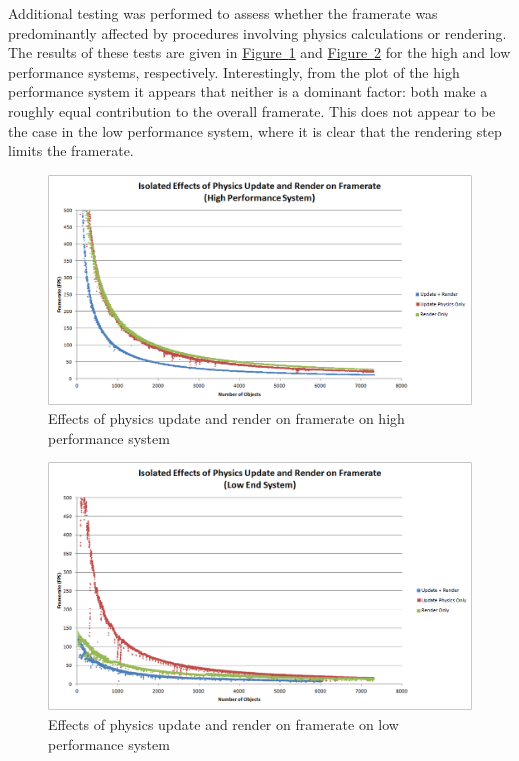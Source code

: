 \documentclass[12pt, titlepage]{article}
\begin{document}
Additional testing was performed to assess whether the framerate was predominantly affected by procedures involving physics calculations or rendering.  The results of these tests are given in \hyperref[fig:isohi]{Figure~\ref*{fig:isohi}} and \hyperref[fig:isolo]{Figure~\ref*{fig:isolo}} for the high and low performance systems, respectively.  Interestingly, from the plot of the high performance system it appears that neither is a dominant factor:  both make a roughly equal contribution to the overall framerate.  This does not appear to be the case in the low performance system, where it is clear that the rendering step limits the framerate.

\begin{figure}[htb]
\centering
\includegraphics[width=\textwidth]{isolatedhigh}
\caption{Effects of physics update and render on framerate on high performance system} \label{fig:isohi}
\end{figure}


\begin{figure}[htb]
\centering
\includegraphics[width=\textwidth]{isolatedlo}
\caption{Effects of physics update and render on framerate on low performance system} \label{fig:isolo}
\end{figure}
\end{document}
